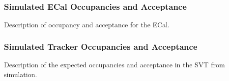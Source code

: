 
\subsubsection{Simulated ECal Occupancies and Acceptance}
Description of occupancy and acceptance for the ECal.

\subsubsection{Simulated Tracker Occupancies and Acceptance}
Description of the expected occupancies and acceptance in the SVT from simulation.

